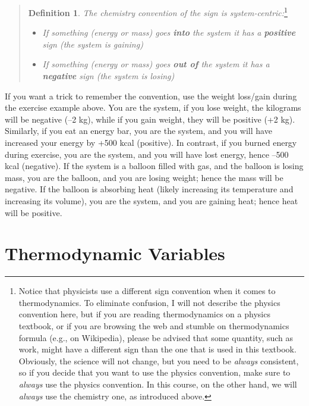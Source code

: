 \documentclass[
  9pt,
]{extbook}
\providecommand{\tightlist}{%
  \setlength{\itemsep}{0pt}\setlength{\parskip}{0pt}}
\theoremstyle{definition}
\newtheorem{definition}{Definition}[chapter]
\theoremstyle{definition}
\theoremstyle{definition}
\theoremstyle{remark}
\begin{document}
\begin{quote}
\begin{definition}
\protect\hypertarget{def:chemistryconv}{}{\label{def:chemistryconv} }\emph{The chemistry convention of the sign is system-centric:}\footnote{Notice that physicists use a different sign convention when it comes to thermodynamics. To eliminate confusion, I will not describe the physics convention here, but if you are reading thermodynamics on a physics textbook, or if you are browsing the web and stumble on thermodynamics formula (e.g., on Wikipedia), please be advised that some quantity, such as work, might have a different sign than the one that is used in this textbook. Obviously, the science will not change, but you need to be \emph{always} consistent, so if you decide that you want to use the physics convention, make sure to \emph{always} use the physics convention. In this course, on the other hand, we will \emph{always} use the chemistry one, as introduced above.}

\begin{itemize}
\tightlist
\item
  \emph{If something (energy or mass) goes \textbf{into} the system it has a \textbf{positive} sign (the system is gaining)}
\item
  \emph{If something (energy or mass) goes \textbf{out of} the system it has a \textbf{negative} sign (the system is losing)}
\end{itemize}
\end{definition}
\end{quote}

If you want a trick to remember the convention, use the weight loss/gain during the exercise example above. You are the system, if you lose weight, the kilograms will be negative (--2 kg), while if you gain weight, they will be positive (+2 kg). Similarly, if you eat an energy bar, you are the system, and you will have increased your energy by +500 kcal (positive). In contrast, if you burned energy during exercise, you are the system, and you will have lost energy, hence --500 kcal (negative). If the system is a balloon filled with gas, and the balloon is losing mass, you are the balloon, and you are losing weight; hence the mass will be negative. If the balloon is absorbing heat (likely increasing its temperature and increasing its volume), you are the system, and you are gaining heat; hence heat will be positive.

\hypertarget{thermodynamic-variables}{%
\section{Thermodynamic Variables}\label{thermodynamic-variables}}
\end{document}
